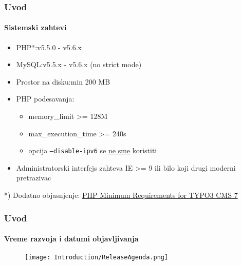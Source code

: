 
\begin{frame}[fragile]
	\frametitle{Uvod}
	\framesubtitle{Sistemski zahtevi}

	\begin{itemize}
		\item PHP*:\tabto{3cm}v5.5.0 - v5.6.x
		\item MySQL:\tabto{3cm}v5.5.x - v5.6.x (no strict mode)
		\item Prostor na disku:\tabto{3cm}min 200 MB
		\item PHP podesavanja:

			\begin{itemize}
				\item memory\_limit >= 128M
				\item max\_execution\_time >= 240s
				\item opcija \texttt{--disable-ipv6} se \underline{ne sme} koristiti
			\end{itemize}

		\item Administratorski interfejs zahteva IE >= 9 ili bilo koji drugi moderni pretrazivac

	\end{itemize}

	\vspace{0.5cm}
	*) Dodatno objasnjenje: \href{http://typo3.org/news/article/php-minimum-requirements-for-typo3-cms-7/}{PHP Minimum Requirements for TYPO3 CMS 7}

\end{frame}


\begin{frame}[fragile]
	\frametitle{Uvod}
	\framesubtitle{Vreme razvoja i datumi objavljivanja}

	\begin{figure}
		\texttt{[image: Introduction/ReleaseAgenda.png]}
	\end{figure}

\end{frame}

